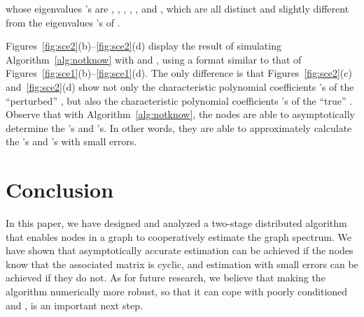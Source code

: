 \documentclass[11pt]{article}
\theoremstyle{plain}
\theoremstyle{definition}
\theoremstyle{remark}
\begin{document}
whose eigenvalues 's are , , , , , and , which are all distinct and slightly different from the eigenvalues 's of .

Figures~\ref{fig:sce2}(b)--\ref{fig:sce2}(d) display the result of simulating Algorithm~\ref{alg:notknow} with   and  , using a format similar to that of Figures~\ref{fig:sce1}(b)--\ref{fig:sce1}(d). The only difference is that Figures~\ref{fig:sce2}(c) and~\ref{fig:sce2}(d) show not only the characteristic polynomial coefficients 's of the ``perturbed'' , but also the characteristic polynomial coefficients 's of the ``true'' . Observe that with Algorithm~\ref{alg:notknow}, the nodes are able to asymptotically determine the 's and 's. In other words, they are able to approximately calculate the 's and 's with small errors.

\section{Conclusion}\label{sec:conc}

In this paper, we have designed and analyzed a two-stage distributed algorithm that enables nodes in a graph to cooperatively estimate the graph spectrum. We have shown that asymptotically accurate estimation can be achieved if the nodes know that the associated matrix is cyclic, and estimation with small errors can be achieved if they do not. As for future research, we believe that making the algorithm numerically more robust, so that it can cope with poorly conditioned  and , is an important next step.



\end{document}
